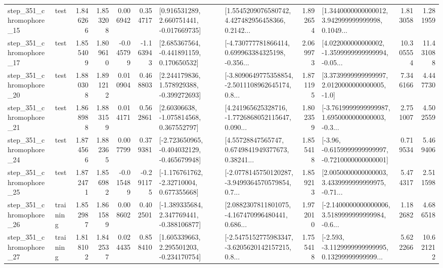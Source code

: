 \begin{tabular}{llrrrrllrlrr}
  step\_351\_chromophore\_15 &      test &      1.846266 &    1.853208 &      0.006942 &  0.354717 &    [0.916531289, 2.660751441, -0.017669735] &  [1.5545209076580742, 4.427482956458366, 0.2142... &       1.892654 &  [1.3440000000000012, 3.942999999999998, 0.1049... &            1.813058 &          1.281959 \\
  step\_351\_chromophore\_17 &      test &      1.855409 &    1.809610 &     -0.045799 & -1.163943 &    [2.685367564, -0.441891159, 0.170650532] &  [-4.730777781866414, 0.699963384325198, -0.356... &       2.069973 &  [4.022000000000002, -1.3599999999999994, -0.05... &           10.305554 &         11.431088 \\
  step\_351\_chromophore\_20 &      test &      1.880308 &    1.891212 &      0.010904 &  0.468803 &    [2.244179836, 1.578929388, -0.399272693] &  [-3.8090649775358854, -2.5011108962645174, 0.8... &       1.871195 &     [3.3739999999999997, 2.0120000000000005, -1.0] &            7.346166 &          4.447730 \\
  step\_351\_chromophore\_21 &      test &      1.868988 &    1.883159 &      0.014171 &  0.562861 &     [2.60306638, -1.075814568, 0.367552797] &  [4.241965625328716, -1.7726868052115647, 0.090... &       1.802359 &  [-3.7619999999999987, 1.6950000000000003, -0.3... &            2.751007 &          4.502559 \\
  step\_351\_chromophore\_24 &      test &      1.874566 &    1.882365 &      0.007799 &  0.379381 &  [-2.723650965, -0.404032129, -0.465679948] &  [4.55728847565747, 0.6749841949377673, 0.38241... &       1.855418 &  [-3.96, -0.6159999999999997, -0.7210000000000001] &            0.719534 &          5.469406 \\
  step\_351\_chromophore\_25 &      test &      1.872471 &    1.856982 &     -0.015489 & -0.291175 &    [-1.176761762, -2.32710004, 0.677355668] &  [-2.0778145750120287, -3.9499364570579854, 0.7... &       1.859213 &  [2.0050000000000003, 3.4339999999999975, -0.71... &            5.474317 &          2.511598 \\
  step\_351\_chromophore\_26 &  training &      1.852987 &    1.861589 &      0.008602 &  0.402501 &   [-1.389335684, 2.347769441, -0.388106877] &  [2.0882307811801075, -4.167470996480441, 0.686... &       1.972010 &  [-2.1400000000000006, 3.5189999999999984, -0.6... &            1.182682 &          4.686518 \\
  step\_351\_chromophore\_27 &  training &      1.818102 &    1.842537 &      0.024435 &  0.858410 &    [1.605339663, 2.295501203, -0.234170754] &  [-2.5475152775983347, -3.6205620142157215, 0.8... &       1.755418 &  [-2.593, -3.1129999999999995, 0.13299999999999... &            5.622266 &         10.621212 \\

\end{tabular}
